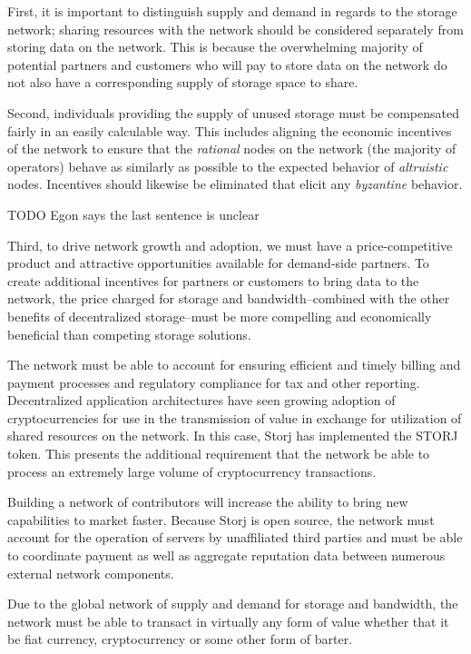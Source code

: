 \documentclass[11pt,fleqn,openany]{book}
\newcommand{\todo}[1]{{\color{red} TODO #1 }}
\begin{document}
First, it is important to distinguish supply and demand in regards to the
storage network; sharing resources with the network should be considered
separately from storing data on the network. This is because
the overwhelming majority of potential partners and customers who will
pay to store data on the
network do not also have a corresponding supply of storage space to share.

Second, individuals providing the supply of unused storage must
be compensated fairly in an easily calculable way.
This includes aligning the economic incentives of the network to ensure
that the {\em rational} nodes on the network (the majority of operators) behave
as similarly as possible to the expected behavior of {\em altruistic} nodes.
Incentives should likewise be eliminated that elicit any {\em byzantine}
behavior.

\todo{Egon says the last sentence is unclear}

Third, to drive network growth and adoption, we must have a price-competitive
product and attractive
opportunities available for demand-side partners. To create additional
incentives for partners or customers to bring data to the network,
the price charged for storage and bandwidth--combined with the other
benefits of decentralized storage--must be
more compelling and economically beneficial than competing storage solutions.

The network must be able to account for ensuring efficient and timely billing
and payment processes and regulatory compliance for tax and other reporting.
Decentralized application architectures have seen growing adoption of
cryptocurrencies for use in the transmission of value in
exchange for utilization of shared resources on the network.
In this case, Storj has implemented the STORJ token.
This presents the additional requirement that the network be able to process
an extremely large volume of cryptocurrency transactions.

Building a network of contributors will increase the ability to bring new
capabilities to market faster.
Because Storj is open source, the network must account for the operation of
servers by unaffiliated third parties and must be able to coordinate payment
as well as aggregate reputation data between numerous external network
components.

Due to the global network of supply and demand for storage and bandwidth, the
network must be able to transact in virtually any form of value whether that it
be fiat currency, cryptocurrency or some other form of barter.
\end{document}
